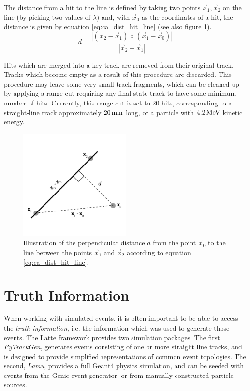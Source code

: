 The distance from a hit to the line is defined by taking two points $\vec{x}_1, \vec{x}_2$ on the line (by picking two values of $\lambda$) and, with $\vec{x}_0$ as the coordinates of a hit, the distance is given by equation \ref{eq:ca_dist_hit_line} (see also figure \ref{fig:ca_perp_dist}).
\begin{equation}\label{eq:ca_dist_hit_line}
d = \frac{|(\vec{x}_2 - \vec{x}_1) \times (\vec{x}_1 - \vec{x}_0)|}{|\vec{x}_2 - \vec{x}_1|}
\end{equation}

Hits which are merged into a key track are removed from their original track. Tracks which become empty as a result of this procedure are discarded. This procedure may leave some very small track fragments, which can be cleaned up by applying a range cut requiring any final state track to have some minimum number of hits. Currently, this range cut is set to 20 hits, corresponding to a straight-line track approximately $20\,\mathrm{mm}$ long, or a particle with $4.2\,\mathrm{MeV}$ kinetic energy.

\begin{figure}
\centering
\includegraphics[width=0.5\textwidth]{chapters/cellularautomaton_images/PerpDist}
\caption[Perpendicular distance from a point to a line in 3D]{\label{fig:ca_perp_dist}Illustration of the perpendicular distance $d$ from the point $\vec{x}_0$ to the line between the points $\vec{x}_1$ and $\vec{x}_2$ according to equation \ref{eq:ca_dist_hit_line}.}
\end{figure}


\section{Truth Information}
When working with simulated events, it is often important to be able to access the \emph{truth information}, i.e. the information which was used to generate those events. The Latte framework provides two simulation packages. The first, \emph{PyTrackGen}, generates events consisting of one or more straight line tracks, and is designed to provide simplified representations of common event topologies. The second, \emph{Lamu}, provides a full Geant4 physics simulation, and can be seeded with events from the Genie event generator, or from manually constructed particle sources.

